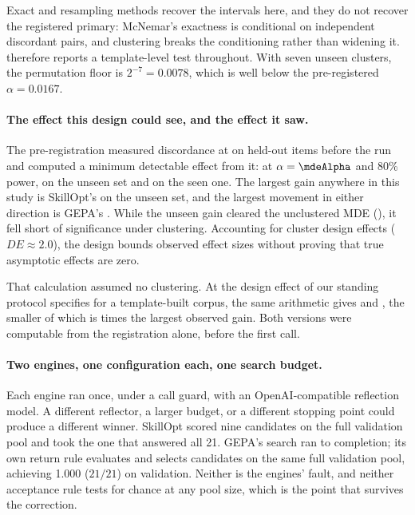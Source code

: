 Exact and resampling methods recover the intervals here, and they do not
recover the registered primary: McNemar's exactness is conditional on
independent discordant pairs, and clustering breaks the conditioning rather
than widening it.  therefore reports a template-level
test throughout. With seven unseen clusters, the permutation floor is
$2^{-7} = 0.0078$, which is well below the pre-registered $\alpha = 0.0167$.

\paragraph{The effect this design could see, and the effect it saw.} The
pre-registration measured discordance at \NUM{\mdeDiscordance} on held-out
items before the run and computed a minimum detectable effect from it: at
$\alpha = \NUM{\mdeAlpha}$ and 80\% power, \NUM{\mdeUnseen} on the unseen set
and \NUM{\mdeSeen} on the seen one. The largest gain anywhere in this study
is SkillOpt's \NUM{\effectUnseenSkilloptVsPlaceboSkillopt} on the unseen set,
and the largest movement in either direction is GEPA's \NUM{\effectUnseenGepaVsPlaceboGepa}.
While the unseen gain cleared the unclustered MDE (\NUM{\mdeUnseen}), it fell
short of significance under clustering.
Accounting for cluster design effects ($DE \approx 2.0$), the design bounds
observed effect sizes without proving that true asymptotic effects are zero.

That calculation assumed no clustering. At the design effect of
\NUM{\protocolDesignEffect} our standing protocol specifies for a
template-built corpus, the same arithmetic gives \NUM{\mdeClusteredUnseen}
and \NUM{\mdeClusteredSeen}, the smaller of which is \NUM{\mdeRatio}
times the largest observed gain. Both versions were computable from the
registration alone, before the first call.

\paragraph{Two engines, one configuration each, one search budget.} Each
engine ran once, under a call guard, with an OpenAI-compatible reflection
model. A different reflector, a larger budget, or a different stopping point
could produce a different winner. SkillOpt scored nine candidates on the full
validation pool and took the one that answered all 21. GEPA's search ran to
completion; its own return rule evaluates and selects candidates on the same
full validation pool, achieving 1.000 ($21/21$) on validation. Neither is the
engines' fault, and neither acceptance rule tests for chance at any pool size,
which is the point that survives the correction.

